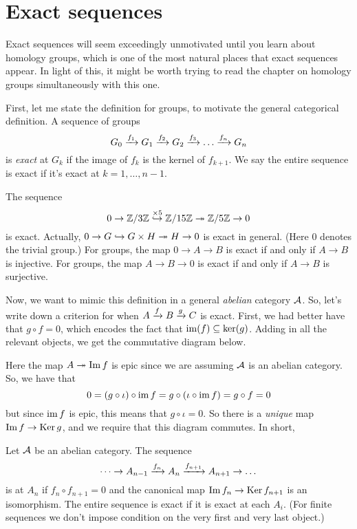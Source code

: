 \section{Exact sequences}
Exact sequences will seem exceedingly unmotivated until you learn about homology groups,
which is one of the most natural places that exact sequences appear.
In light of this, it might be worth trying to read the chapter on homology groups
simultaneously with this one.

First, let me state the definition for groups, to motivate the general categorical definition.
A sequence of groups
\[ G_0 \taking{f_1} G_1 \taking{f_2} G_2 \taking{f_3} \dots \taking{f_n} G_n \]
is \emph{exact} at $G_k$ if the image of $f_k$ is the kernel of $f_{k+1}$.
We say the entire sequence is exact if it's exact at $k=1,\dots,n-1$.
\begin{example}
	\listhack
	\begin{enumerate}[(a)]
		\ii The sequence
		\[ 0 \to \Zc 3
			\overset{\times 5}{\injto} \Zc{15}
			\surjto \Zc{5}
			\to 0 \]
		is exact.
		Actually, $0 \to G \injto G \times H \surjto H \to 0$ is exact in general.
		(Here $0$ denotes the trivial group.)
		\ii For groups, the map $0 \to A \to B$ is exact if and only if $A \to B$ is injective.
		\ii For groups, the map $A \to B \to 0$ is exact if and only if $A \to B$ is surjective.
	\end{enumerate}
\end{example}

Now, we want to mimic this definition in a general \emph{abelian} category $\AA$.
So, let's write down a criterion for when $A \taking f B \taking g C$ is exact.
First, we had better have that $g \circ f = 0$,
which encodes the fact that $\img(f) \subseteq \ker(g)$.
Adding in all the relevant objects, we get the commutative diagram below.
\begin{center}
\end{center}
Here the map $A \surjto \Img f$ is epic since we are assuming $\AA$ is an abelian category.
So, we have that
\[ 0 = (g \circ \iota) \circ \img f = g \circ (\iota \circ \img f) = g \circ f = 0 \]
but since $\img f$ is epic, this means that $g \circ \iota = 0$.
So there is a \emph{unique} map $\Img f \to \Ker g$, and we require that this diagram commutes.
In short,
\begin{definition}
	Let $\AA$ be an abelian category. The sequence
	\[ \dots \to A_{n-1} \taking{f_n} A_n \taking{f_{n+1}} A_{n+1} \to \dots \]
	is  at $A_n$ if $f_n \circ f_{n+1} = 0$ and
	the canonical map $\Img f_n \to \Ker f_{n+1}$ is an isomorphism.
	The entire sequence is exact if it is exact at each $A_i$.
	(For finite sequences we don't impose condition on the very first and very last object.)
\end{definition}

